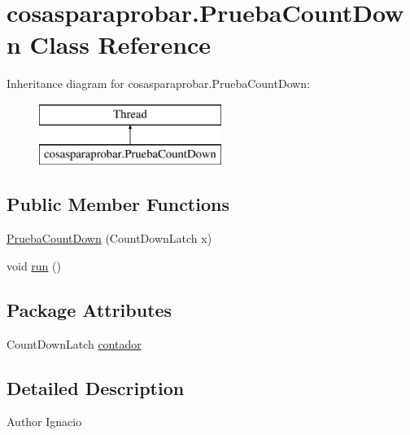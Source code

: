 \hypertarget{classcosasparaprobar_1_1_prueba_count_down}{}\section{cosasparaprobar.\+Prueba\+Count\+Down Class Reference}
\label{classcosasparaprobar_1_1_prueba_count_down}
Inheritance diagram for cosasparaprobar.\+Prueba\+Count\+Down\+:\begin{figure}[H]
\begin{center}
\leavevmode
\includegraphics[height=2.000000cm]{classcosasparaprobar_1_1_prueba_count_down}
\end{center}
\end{figure}
\subsection*{Public Member Functions}
\begin{DoxyCompactItemize}
\item 
\mbox{\hyperlink{classcosasparaprobar_1_1_prueba_count_down_a89832a2fb0a7768fdd9541cfca2508bf}{Prueba\+Count\+Down}} (Count\+Down\+Latch x)
\item 
void \mbox{\hyperlink{classcosasparaprobar_1_1_prueba_count_down_a7fbad5dff58f3d7bb6f35f3b357dc242}{run}} ()
\end{DoxyCompactItemize}
\subsection*{Package Attributes}
\begin{DoxyCompactItemize}
\item 
Count\+Down\+Latch \mbox{\hyperlink{classcosasparaprobar_1_1_prueba_count_down_a94e899bc1667541a563b159ff8d5229e}{contador}}
\end{DoxyCompactItemize}


\subsection{Detailed Description}
\begin{DoxyAuthor}{Author}
Ignacio 
\end{DoxyAuthor}


